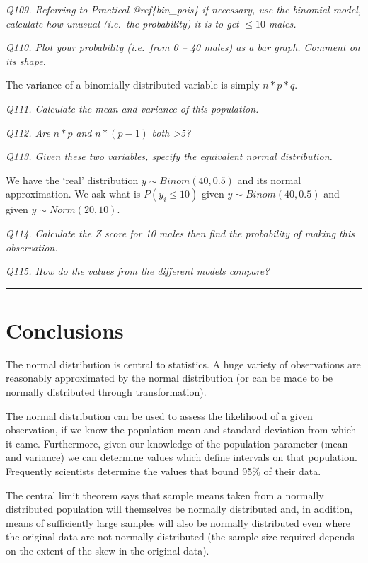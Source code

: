 \documentclass[
  11pt,
  a4paper,
]{book}
\begin{document}
\emph{Q109. Referring to Practical @ref\{bin\_pois\} if necessary, use the binomial model, calculate how unusual (i.e.~the probability) it is to get} \(\leq 10\) \emph{males.}

\emph{Q110. Plot your probability (i.e.~from 0 -- 40 males) as a bar graph. Comment on its shape.}

The variance of a binomially distributed variable is simply \(n*p*q\).

\emph{Q111. Calculate the mean and variance of this population.}

\emph{Q112. Are} \(n*p\) \emph{and} \(n*(p-1)\) \emph{both \textgreater5?}

\emph{Q113. Given these two variables, specify the equivalent normal distribution.}

We have the `real' distribution \(y \sim Binom(40,0.5)\) and its normal approximation. We ask what is \(P(y_i \leq 10)\) given \(y \sim Binom(40, 0.5)\) and given \(y \sim Norm(20, 10)\).

\emph{Q114. Calculate the Z score for 10 males then find the probability of making this observation.}

\emph{Q115. How do the values from the different models compare?}

\begin{center}\rule{0.5\linewidth}{0.5pt}\end{center}

\hypertarget{conclusions-2}{%
\section{Conclusions}\label{conclusions-2}}

The normal distribution is central to statistics. A huge variety of observations are reasonably approximated by the normal distribution (or can be made to be normally distributed through transformation).

The normal distribution can be used to assess the likelihood of a given observation, if we know the population mean and standard deviation from which it came. Furthermore, given our knowledge of the population parameter (mean and variance) we can determine values which define intervals on that population. Frequently scientists determine the values that bound 95\% of their data.

The central limit theorem says that sample means taken from a normally distributed population will themselves be normally distributed and, in addition, means of sufficiently large samples will also be normally distributed even where the original data are not normally distributed (the sample size required depends on the extent of the skew in the original data).
\end{document}
